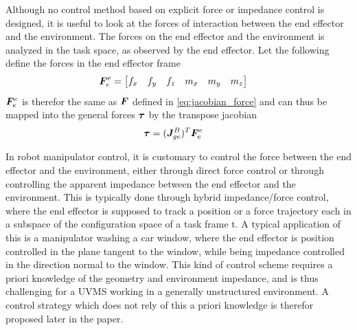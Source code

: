Although no control method based on explicit force or impedance control is designed, it is useful to look at the forces of interaction between the end effector and the environment.
The forces on the end effector and the environment is analyzed in the task space, as observed by the end effector. Let the following define the forces in the end effector frame 
\begin{align}
	\boldsymbol F_{e}^e&=\begin{bmatrix} f_x & f_y & f_z & m_x & m_y & m_z \end{bmatrix}
	\label{eq:force_force}
\end{align}
$\boldsymbol F_{e}^e$ is therefor the same as $\boldsymbol F$ defined in \eqref{eq:jacobian_force} and can thus be mapped into the general forces $\boldsymbol \tau$ by the transpose jacobian
\begin{align}
	\boldsymbol \tau&=(\boldsymbol J_{ge}^{B})^T\boldsymbol F_{e}^e
	\label{eq:jacobian-force2}
\end{align}

In robot manipulator control, it is customary to control the force between the end effector and the environment, either through direct force control or through controlling the apparent impedance between the end effector and the environment. This is typically done through hybrid impedance/force control, where the end effector is supposed to track a position or a force trajectory each in a subspace of the configuration space of a task frame \frame t. 
A typical application of this is a manipulator washing a car window, where the end effector is position controlled in the plane tangent to the window, while being impedance controlled in the direction normal to the window. 
This kind of control scheme requires a priori knowledge of the geometry and environment impedance, and is thus challenging for a UVMS working in a generally unstructured environment. 
A control strategy which does not rely of this a priori knowledge is therefor proposed later in the paper.



























